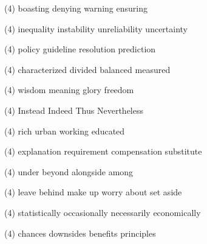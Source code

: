\item
\begin{tasks}(4)
	\task boasting
	\task denying
	\task warning
	\task ensuring
\end{tasks}
\item
\begin{tasks}(4)
	\task inequality
	\task instability
	\task unreliability
	\task uncertainty
\end{tasks}
\item
\begin{tasks}(4)
	\task policy
	\task guideline
	\task resolution
	\task prediction
\end{tasks}
\item
\begin{tasks}(4)
	\task characterized
	\task divided
	\task balanced
	\task measured
\end{tasks}
\item
\begin{tasks}(4)
	\task wisdom
	\task meaning
	\task glory
	\task freedom
\end{tasks}
\item
\begin{tasks}(4)
	\task Instead
	\task Indeed
	\task Thus
	\task Nevertheless
\end{tasks}
\item
\begin{tasks}(4)
	\task rich
	\task urban
	\task working
	\task educated
\end{tasks}
\item
\begin{tasks}(4)
	\task explanation
	\task requirement
	\task compensation
	\task substitute
\end{tasks}
\item
\begin{tasks}(4)
	\task under
	\task beyond
	\task alongside
	\task among
\end{tasks}
\item
\begin{tasks}(4)
	\task leave behind
	\task make up
	\task worry about
	\task set aside
\end{tasks}
\item
\begin{tasks}(4)
	\task statistically
	\task occasionally
	\task necessarily
	\task economically
\end{tasks}
\item
\begin{tasks}(4)
	\task chances
	\task downsides
	\task benefits
	\task principles
\end{tasks}
